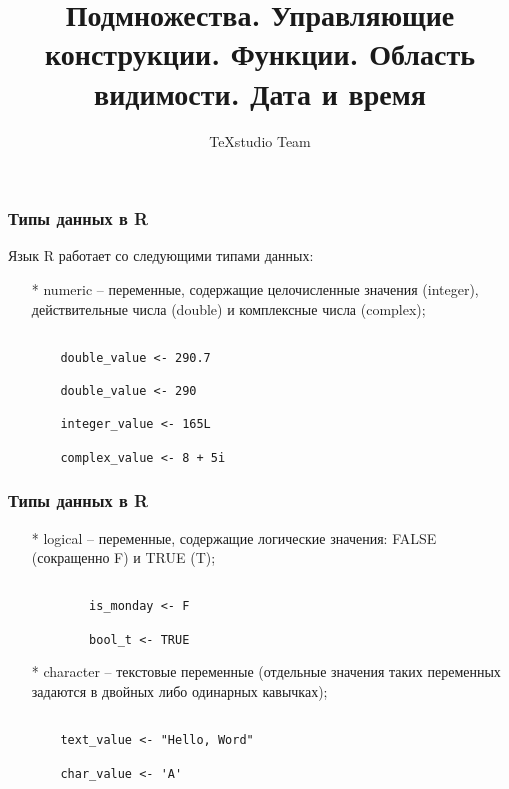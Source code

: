 \documentclass{beamer}
\title{Подмножества. Управляющие конструкции. Функции. 
	Область видимости. Дата и время
}
\author{TeXstudio Team}
\begin{document}
	
	
\begin{frame}[plain]
    \maketitle
\end{frame}

\begin{frame}[fragile]
    \frametitle{Типы данных в R}
    Язык R работает со следующими типами данных:
    
    \begin{itemize}
    	\item[*] numeric – переменные, содержащие целочисленные значения (integer), действительные числа (double) и комплексные числа (complex);
    \begin{verbatim}
    
    double_value <- 290.7
    	
    double_value <- 290
    
    integer_value <- 165L
    
    complex_value <- 8 + 5i
    \end{verbatim}
      
    

   \end{itemize} 
\end{frame}   
\begin{frame}[fragile]
	\frametitle{Типы данных в R}
	\begin{itemize}
	\item[*] logical – переменные, содержащие логические значения: FALSE (сокращенно F) и TRUE (T);
		\begin{verbatim}
			
		is_monday <- F
		
		bool_t <- TRUE	
		\end{verbatim}	     
    \item[*] character – текстовые переменные (отдельные значения таких переменных задаются в двойных либо одинарных кавычках);
    
        \begin{verbatim}
        	
    text_value <- "Hello, Word"
    
    char_value <- 'A'
    
		\end{verbatim}
	\end{itemize}    
\end{frame}
\end{document}
